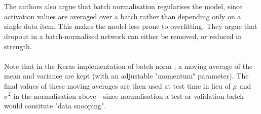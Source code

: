 \documentclass[11pt]{article} %
\theoremstyle{plain}
\theoremstyle{definition}
\begin{document}
\\
\\
\noindent
The authors also argue that batch normalisation regularises the model, since activation values are averaged over a batch rather than depending only on a single data item. This makes the model less prone to overfitting. They argue that dropout in a batch-normalised network can either be removed, or reduced in strength.
\\
\\
\noindent
Note that in the Keras implementation of batch norm \cite{keras_docs_batch_norm}, a moving average of the mean and variance are kept (with an adjustable "momentum" parameter). The final values of these moving averages are then used at test time in lieu of \(\mu\) and \(\sigma^2\) in the normalisation above - since normalisation a test or validation batch would consitute "data snooping". 
\newpage
\end{document}
